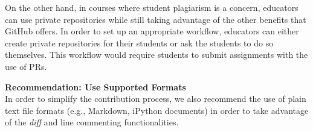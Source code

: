 
On the other hand, in courses where student plagiarism is a concern, educators can use private repositories while still taking advantage of the other benefits that GitHub offers. In order to set up an appropriate workflow, educators can either create private repositories for their students or ask the students to do so themselves. This workflow would require students to submit assignments with the use of PRs.

\textbf{Recommendation: Use Supported Formats}\\
In order to simplify the contribution process, we also recommend the use of plain text file formats (e.g., Markdown, iPython documents) in order to take advantage of the \textit{diff} and line commenting functionalities.



